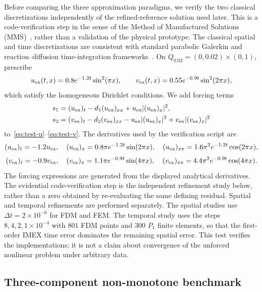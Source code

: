 Before comparing the three approximation paradigms, we verify the two classical discretizations independently of the refined-reference solution used later. This is a code-verification step in the sense of the Method of Manufactured Solutions (MMS)~\cite{roache2002mms,oberkampf2010vv}, rather than a validation of the physical prototype. The classical spatial and time discretizations are consistent with standard parabolic Galerkin and reaction--diffusion time-integration frameworks~\cite{thomee2006galerkin,hundsdorfer2003adr}. On $Q_{0.02}=(0,0.02)\times(0,1)$, prescribe
\[
 u_{\rm ex}(t,x)=0.8e^{-1.2t}\sin^2(\pi x),\qquad
 v_{\rm ex}(t,x)=0.55e^{-0.9t}\sin^2(2\pi x),
\]
which satisfy the homogeneous Dirichlet conditions. We add forcing terms
\begin{align*}
 s_1&=(u_{\rm ex})_t-d_1(u_{\rm ex})_{xx}+u_{\rm ex}|(u_{\rm ex})_x|^2,\\
 s_2&=(v_{\rm ex})_t-d_2(v_{\rm ex})_{xx}-u_{\rm ex}|(u_{\rm ex})_x|^2+v_{\rm ex}|(v_{\rm ex})_x|^2
\end{align*}
to~\eqref{eq:test-u}--\eqref{eq:test-v}. The derivatives used by the verification script are
\[
 (u_{\rm ex})_t=-1.2u_{\rm ex},\quad
 (u_{\rm ex})_x=0.8\pi e^{-1.2t}\sin(2\pi x),\quad
 (u_{\rm ex})_{xx}=1.6\pi^2e^{-1.2t}\cos(2\pi x),
\]
\[
 (v_{\rm ex})_t=-0.9v_{\rm ex},\quad
 (v_{\rm ex})_x=1.1\pi e^{-0.9t}\sin(4\pi x),\quad
 (v_{\rm ex})_{xx}=4.4\pi^2e^{-0.9t}\cos(4\pi x).
\]
The forcing expressions are generated from the displayed analytical derivatives. The evidential code-verification step is the independent refinement study below, rather than a zero obtained by re-evaluating the same defining residual. Spatial and temporal refinements are performed separately. The spatial studies use $\Delta t=2\times10^{-6}$ for FDM and FEM. The temporal study uses the steps $8,4,2,1\times10^{-4}$ with $801$ FDM points and $300$ $P_1$ finite elements, so that the first-order IMEX time error dominates the remaining spatial error. This test verifies the implementations; it is not a claim about convergence of the unforced nonlinear problem under arbitrary data.

\subsection{Three-component non-monotone benchmark}
\label{subsec:three-component}

